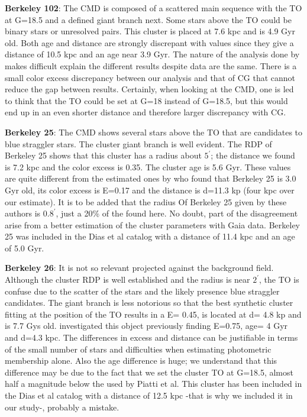 \documentclass[draft]{aa}
\begin{document}
\textbf{Berkeley 102}:
 The CMD is composed of a scattered main sequence with the TO at G=18.5 and a defined giant branch next. Some stars above the TO could be binary stars or unresolved pairs. This cluster is placed at 7.6 kpc and is 4.9 Gyr old. Both age and distance are strongly discrepant with \cite{Cantat_2020} values since they give a distance of 10.5 kpc and an age near 3.9 Gyr. The nature of the analysis done by \cite{Cantat_2020} makes difficult explain the different results despite data are the same. There is a small color excess discrepancy between our analysis and that of CG that cannot reduce the gap between results. Certainly, when looking at the CMD, one is led to think that the TO could be set at G=18 instead of G=18.5, but this would end up in an even shorter distance and therefore larger discrepancy with CG.  

\textbf{Berkeley 25}:
The CMD shows several stars above the TO that are candidates to blue straggler stars. The cluster giant branch is well evident. The RDP of Berkeley 25 shows that this cluster has a radius about $5^{\prime}$; the distance we found is 7.2 kpc and the color excess is 0.35. The cluster age is 5.6 Gyr. These values are quite different from the estimated ones by \cite{2005A&A...442..917C} who found that Berkeley 25 is 3.0 Gyr old, its color excess is E=0.17 and the distance is d=11.3 kp (four kpc over our estimate). It is to be added that the radius Of Berkeley 25 given by these authors is $0.8^{\prime}$, just a 20\% of the found here. No doubt, part of the disagreement arise from a better estimation of the cluster parameters with Gaia data.  Berkeley 25 was included in the Dias et al catalog with a distance of 11.4 kpc and an age of 5.0 Gyr.

\textbf{Berkeley 26}:
It is not so relevant projected against the background field. Although the cluster RDP is well established and the radius is near $2^{\prime}$, the TO is confuse due to the scatter of the stars and the likely presence blue straggler candidates. The giant branch is less notorious so that the best synthetic cluster fitting at the position of the TO results in a  E= 0.45, is located at d= 4.8 kp and is 7.7 Gys old. \cite{2010MNRAS.402.2720P} investigated this object previously finding  E=0.75, age= 4 Gyr and d=4.3 kpc. The differences in excess and distance can be justifiable in terms of the small number of stars and difficulties when estimating photometric membership alone. Also the age difference is huge; we understand that this difference may be due to the fact that we set the cluster TO at G=18.5, almost half a magnitude below the used by Piatti et al. This cluster has been included in the Dias et al catalog with a distance of 12.5 kpc -that is why we included it in our study-, probably a mistake.
\end{document}
